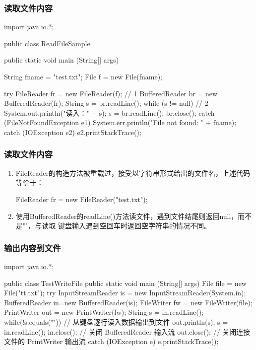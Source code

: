 \begin{frame}[fragile] %
  \frametitle{读取文件内容}


  \begin{javaCode}
    import java.io.*;

    public class ReadFileSample {
      public static void main (String[] args) {
        String fname = "test.txt"; 
        File f = new File(fname);

        try {
          FileReader fr = new FileReader(f);  // 1
          BufferedReader br = new BufferedReader(fr); 
          String s = br.readLine();
          while (s != null) { // 2
            System.out.println("读入：" + s);
            s = br.readLine(); }
          br.close();
        } catch (FileNotFoundException e1) {
          System.err.println("File not found: " + fname); 
        } catch (IOException e2) {
          e2.printStackTrace(); 
        }
      } 
    }
  \end{javaCode}
\end{frame}

\begin{frame}[fragile] %
  \frametitle{读取文件内容}


  \begin{enumerate}
  \item FileReader的构造方法被重载过，接受以字符串形式给出的文件名，上述代码等价于：
    \begin{javaCode}
      FileReader fr = new FileReader("test.txt");
    \end{javaCode}
  \item 使用BufferedReader的readLine()方法读文件，遇到文件结尾则返回null，而不是""，与读取
    键盘输入遇到空回车时返回空字符串的情况不同。
  \end{enumerate}
  
\end{frame}

\begin{frame}[fragile] %
  \frametitle{输出内容到文件}

  
  \begin{javaCode}
    import java.io.*;
    
    public class TestWriteFile {
      public static void main (String[] args) {
        File file = new File("tt.txt");
        try {
          InputStreamReader is = new InputStreamReader(System.in); 
          BufferedReader in=new BufferedReader(is);
          FileWriter fw = new FileWriter(file);
          PrintWriter out = new PrintWriter(fw);
          String s = in.readLine();
          while(!s.equals("")) { // 从键盘逐行读入数据输出到文件
            out.println(s);
            s = in.readLine(); 
          }
          in.close(); // 关闭 BufferedReader 输入流
          out.close(); // 关闭连接文件的 PrintWriter 输出流
        } catch (IOException e) {
          e.printStackTrace(); 
        }
      } 
    }
  \end{javaCode}
\end{frame}

